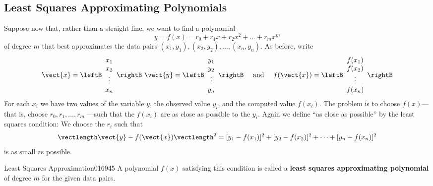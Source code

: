 \subsection*{Least Squares Approximating Polynomials}
Suppose now that, rather than a straight line, we want to find a polynomial
\begin{equation*}
y = f(x) = r_0 + r_1x + r_2x^2 + \dots + r_mx^m
\end{equation*}
of degree $m$ that best approximates the data pairs $(x_{1}, y_{1}), (x_{2}, y_{2}), \dots, (x_{n}, y_{n})$. As before, write
\begin{equation*}
\vect{x} = \leftB \begin{array}{c}
x_1 \\
x_2 \\
\vdots \\
x_n
\end{array} \rightB \ \vect{y} = \leftB \begin{array}{c}
y_1 \\
y_2 \\
\vdots \\
y_n
\end{array} \rightB
\quad \mbox{ and } \quad f(\vect{x}) = 
\leftB \begin{array}{c}
f(x_1) \\
f(x_2) \\
\vdots \\
f(x_n)
\end{array} \rightB
\end{equation*}
For each $x_{i}$ we have two values of the variable $y$, the observed value $y_{i}$, and the computed value $f(x_{i})$. The problem is to choose $f(x)$---that is, choose $r_{0}, r_{1}, \dots, r_{m}$ ---such that the $f(x_{i})$ are as close as possible to the $y_{i}$. Again we define ``as close as possible'' by the least squares condition: We choose the $r_{i}$ such that
\begin{equation*}
\vectlength \vect{y} - f(\vect{x}) \vectlength ^2 = [y_1 - f(x_1)]^2 + [y_2 - f(x_2)]^2 + \dotsb + [y_n - f(x_n)]^2 
\end{equation*}
is as small as possible.

\begin{definition}{Least Squares Approximation}{016945} %
A polynomial $f(x)$ satisfying this condition is called a \textbf{least squares approximating polynomial} of degree $m$ for the given data pairs.
\end{definition}

